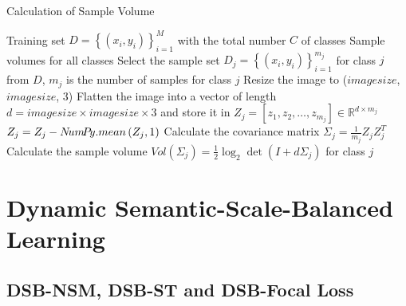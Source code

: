 \documentclass[10pt]{article} %
\begin{document}
\begin{algorithm}[h]
   \caption{Calculation of Sample Volume}
   \label{alg1}
\begin{algorithmic}
    Training set $D = \left\{ {\left( {{x_i},{y_i}} \right)} \right \}_{i = 1}^M$ with the total number $C$ of classes
    Sample volumes for all classes
   \STATE Select the sample set ${D_j} = \left\{ {\left( {{x_i},{y_i}} \right)} \right\}_{i = 1}^{{m_j}}$ for class $j$ from $D$, ${m_j}$ is the number of samples for class $j$
   \STATE Resize the image to ($imagesize$, $imagesize$, 3)
   \STATE Flatten the image into a vector of length $d = imagesize \times imagesize \times 3$ and store it in ${Z_j} = \left[ {{z_1},{z_2}, \ldots ,{z_{{m_j}}}} \right] \in {\mathbb{R}^{d \times {m_j}}}$
   \STATE ${Z_j} = {Z_j} - N\!um\!P\!y.mean\left( {{Z_j}, {\rm{1}}} \right)$
   \STATE Calculate the covariance matrix ${\Sigma _j} = \frac{1}{{{m_j}}}{Z_j}Z_j^T$
   \STATE Calculate the sample volume $V\!ol\left( {{\Sigma _j}} \right) = \frac{1}{2}{\log _2}\det \left( {I + d{\Sigma _j}} \right)$ for class $j$
   \ENDFOR
\end{algorithmic}
\end{algorithm}



\section{Dynamic Semantic-Scale-Balanced Learning}

\subsection{DSB-NSM, DSB-ST and DSB-Focal Loss\label{D.1}}
\end{document}
